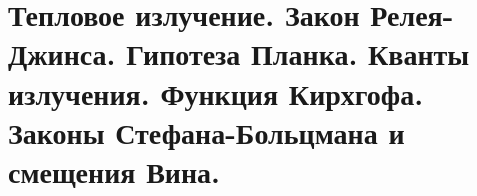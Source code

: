 \chapter{Тепловое излучение. Закон Релея-Джинса. Гипотеза Планка. 
Кванты излучения. Функция Кирхгофа. Законы Стефана-Больцмана и 
смещения Вина.}

\newpage
